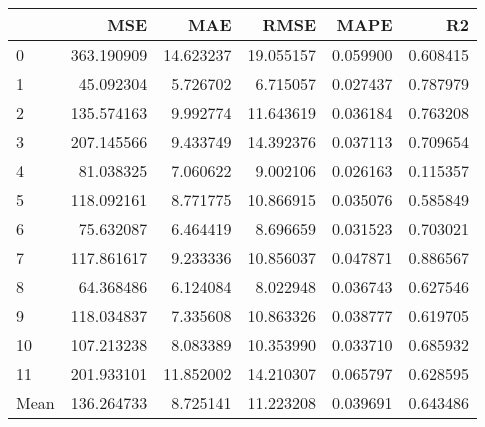 \begin{tabular}{lrrrrr}
\toprule
 & MSE & MAE & RMSE & MAPE & R2 \\
\midrule
0 & 363.190909 & 14.623237 & 19.055157 & 0.059900 & 0.608415 \\
1 & 45.092304 & 5.726702 & 6.715057 & 0.027437 & 0.787979 \\
2 & 135.574163 & 9.992774 & 11.643619 & 0.036184 & 0.763208 \\
3 & 207.145566 & 9.433749 & 14.392376 & 0.037113 & 0.709654 \\
4 & 81.038325 & 7.060622 & 9.002106 & 0.026163 & 0.115357 \\
5 & 118.092161 & 8.771775 & 10.866915 & 0.035076 & 0.585849 \\
6 & 75.632087 & 6.464419 & 8.696659 & 0.031523 & 0.703021 \\
7 & 117.861617 & 9.233336 & 10.856037 & 0.047871 & 0.886567 \\
8 & 64.368486 & 6.124084 & 8.022948 & 0.036743 & 0.627546 \\
9 & 118.034837 & 7.335608 & 10.863326 & 0.038777 & 0.619705 \\
10 & 107.213238 & 8.083389 & 10.353990 & 0.033710 & 0.685932 \\
11 & 201.933101 & 11.852002 & 14.210307 & 0.065797 & 0.628595 \\
Mean & 136.264733 & 8.725141 & 11.223208 & 0.039691 & 0.643486 \\
\bottomrule
\end{tabular}
